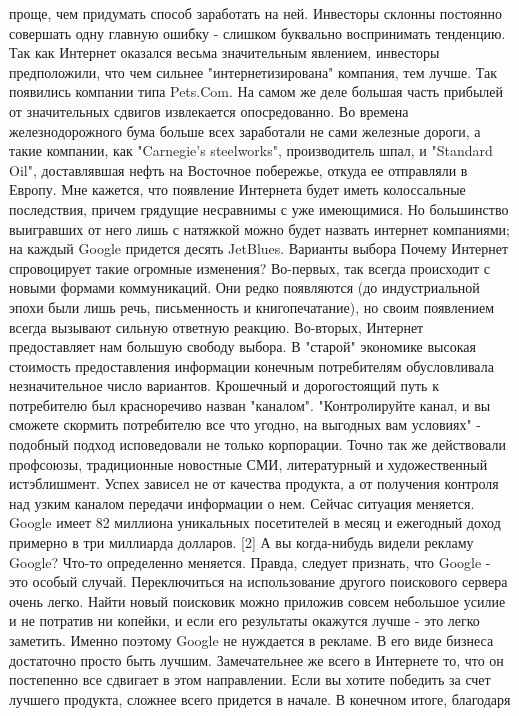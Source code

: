 \documentclass[ebook,12pt,oneside,openany]{memoir}
\begin{document}
проще, чем придумать способ заработать на ней. Инвесторы склонны
постоянно совершать одну главную ошибку - слишком буквально
воспринимать тенденцию. Так как Интернет оказался весьма значительным
явлением, инвесторы предположили, что чем сильнее "интернетизирована"
компания, тем лучше. Так появились компании типа Pets.Com. На самом же
деле большая часть прибылей от значительных сдвигов извлекается
опосредованно. Во времена железнодорожного бума больше всех заработали
не сами железные дороги, а такие компании, как "Carnegie's
steelworks", производитель шпал, и "Standard Oil", доставлявшая нефть
на Восточное побережье, откуда ее отправляли в Европу. Мне кажется,
что появление Интернета будет иметь колоссальные последствия, причем
грядущие несравнимы с уже имеющимися. Но большинство выигравших от
него лишь с натяжкой можно будет назвать интернет компаниями; на
каждый Google придется десять JetBlues. Варианты выбора Почему
Интернет спровоцирует такие огромные изменения? Во-первых, так всегда
происходит с новыми формами коммуникаций. Они редко появляются (до
индустриальной эпохи были лишь речь, письменность и книгопечатание),
но своим появлением всегда вызывают сильную ответную реакцию.
Во-вторых, Интернет предоставляет нам большую свободу выбора. В
"старой" экономике высокая стоимость предоставления информации
конечным потребителям обусловливала незначительное число вариантов.
Крошечный и дорогостоящий путь к потребителю был красноречиво назван
"каналом". "Контролируйте канал, и вы сможете скормить потребителю все
что угодно, на выгодных вам условиях" - подобный подход исповедовали
не только корпорации. Точно так же действовали профсоюзы, традиционные
новостные СМИ, литературный и художественный истэблишмент. Успех
зависел не от качества продукта, а от получения контроля над узким
каналом передачи информации о нем. Сейчас ситуация меняется. Google
имеет 82 миллиона уникальных посетителей в месяц и ежегодный доход
примерно в три миллиарда долларов. [2] А вы когда-нибудь видели
рекламу Google? Что-то определенно меняется. Правда, следует признать,
что Google - это особый случай. Переключиться на использование другого
поискового сервера очень легко. Найти новый поисковик можно приложив
совсем небольшое усилие и не потратив ни копейки, и если его
результаты окажутся лучше - это легко заметить. Именно поэтому Google
не нуждается в рекламе. В его виде бизнеса достаточно просто быть
лучшим. Замечательнее же всего в Интернете то, что он постепенно все
сдвигает в этом направлении. Если вы хотите победить за счет лучшего
продукта, сложнее всего придется в начале. В конечном итоге, благодаря
\end{document}
